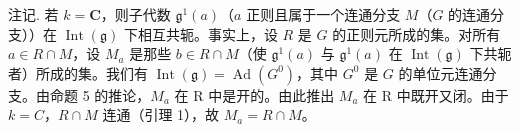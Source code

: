 注记. 若 \(k = \mathbf{C}\)，则子代数 \(\mathfrak{g}^1(a)\)（\(a\) 正则且属于一个连通分支 \(M\)（\(G\) 的连通分支））在 \(\operatorname{Int}(\mathfrak{g})\) 下相互共轭。事实上，设 \(R\) 是 \(G\) 的正则元所成的集。对所有 \(a \in R \cap M\)，设 \(M_a\) 是那些 \(b \in R \cap M\)（使 \(\mathfrak{g}^1(a)\) 与 \(\mathfrak{g}^1(a)\) 在 \(\operatorname{Int}(\mathfrak{g})\) 下共轭者）所成的集。我们有 \(\operatorname{Int}(\mathfrak{g}) = \operatorname{Ad}(G^0)\)，其中 \(G^0\) 是 \(G\) 的单位元连通分支。由命题 5 的推论，\(M_{a}\) 在 R 中是开的。由此推出 \(M_{a}\) 在 R 中既开又闭。由于 \(k = C\)，\(R \cap M\) 连通（引理 1），故 \(M_{a} = R \cap M\)。


